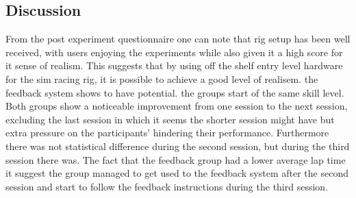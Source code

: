 \subsection{Discussion}
\label{sec:eval-Discussion}

From the post experiment questionnaire one can note that rig setup has been well received, with users enjoying the experiments while also given it a high score for it sense of realism. This suggests that by using off the shelf entry level hardware for the sim racing rig, it is possible to achieve a good level of realisem. the feedback system shows to have potential. the groups start of the same skill level. Both groups show a noticeable improvement from one session to the next session, excluding the last session in which it seems the shorter session might have but extra pressure on the participants' hindering their performance. Furthermore there was not statistical difference during the second session, but during the third session there was. The fact that the feedback group had a lower average lap time it suggest the group managed to get used to the feedback system after the second session and start to follow the feedback instructions during the third session.